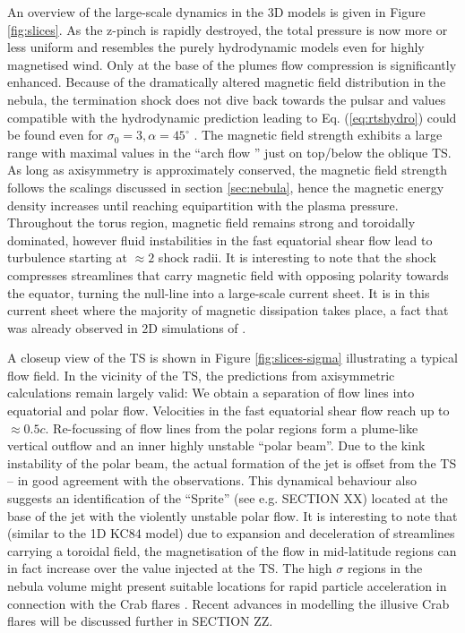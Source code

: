 An overview of the large-scale dynamics in the 3D models is given in Figure \ref{fig:slices}.  As the z-pinch is rapidly destroyed, the total pressure is now more or less uniform and resembles the purely hydrodynamic models even for highly magnetised wind.  
Only at the base of the plumes flow compression is significantly enhanced.  
Because of the dramatically altered magnetic field distribution in the nebula, the termination shock does not dive back towards the pulsar and values compatible with the hydrodynamic prediction leading to Eq. (\ref{eq:rtshydro}) could be found even for $\sigma_0=3,\alpha=45^\circ$ \citep{PorthKomissarov2014a}.  
The magnetic field strength exhibits a large range with maximal values in the ``arch flow '' just on top/below the oblique TS.  As long as axisymmetry is approximately conserved, the magnetic field strength follows the scalings discussed in section \ref{sec:nebula}, hence the magnetic energy density increases until reaching equipartition with the plasma pressure.  Throughout the torus region, magnetic field remains strong and toroidally dominated, however fluid instabilities in the fast equatorial shear flow lead to turbulence starting at $\approx 2 $ shock radii.  It is interesting to note that the shock compresses streamlines that carry magnetic field with opposing polarity towards the equator, turning the null-line into a large-scale current sheet.  It is in this current sheet where the majority of magnetic dissipation takes place, a fact that was already observed in 2D simulations of \cite{camus2009}.  

A  closeup view of the TS is shown in Figure \ref{fig:slices-sigma} illustrating a typical flow field.  In the vicinity of the TS, the predictions from axisymmetric calculations remain largely valid:  We obtain a separation of flow lines into equatorial and polar flow.  Velocities in the fast equatorial shear flow reach up to $\approx0.5c$.  Re-focussing of flow lines from the polar regions form a plume-like vertical outflow and an inner highly unstable ``polar beam''.  Due to the kink instability of the polar beam, the actual formation of the jet is offset from the TS -- in good agreement with the observations.  This dynamical behaviour also suggests an identification of the ``Sprite'' (see e.g. SECTION XX) located at the base of the jet  with the violently unstable polar flow.  
It is interesting to note that (similar to the 1D KC84 model) due to expansion and deceleration of streamlines carrying a toroidal field, the magnetisation of the flow in mid-latitude regions can in fact increase over the value injected at the TS.  The high $\sigma$ regions in the nebula volume might present suitable locations for rapid particle acceleration in connection with the Crab flares \citep[e.g.][]{LyutikovSironi2016}.  Recent advances in modelling the illusive Crab flares will be discussed further in SECTION ZZ.  



